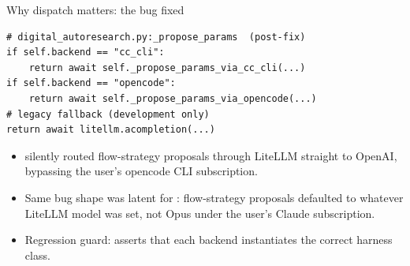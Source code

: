 \begin{frame}[fragile]{Why dispatch matters: the bug  fixed}
  \begin{lstlisting}[style=pystyle]
# digital_autoresearch.py:_propose_params  (post-fix)
if self.backend == "cc_cli":
    return await self._propose_params_via_cc_cli(...)
if self.backend == "opencode":
    return await self._propose_params_via_opencode(...)
# legacy fallback (development only)
return await litellm.acompletion(...)
  \end{lstlisting}
  \footnotesize
  \begin{itemize}
    \item {}  silently routed flow-strategy
          proposals through LiteLLM straight to OpenAI, bypassing
          the user's opencode CLI subscription.
    \item Same bug shape was latent for : flow-strategy
          proposals defaulted to whatever LiteLLM model was set, not
          Opus under the user's Claude subscription.
    \item Regression guard:
          asserts that each backend instantiates the correct harness
          class.
  \end{itemize}
\end{frame}
